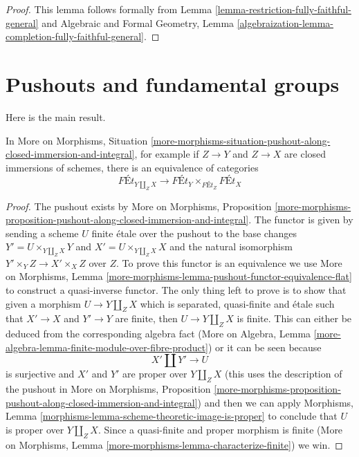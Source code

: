 \begin{proof}
This lemma follows formally from
Lemma \ref{lemma-restriction-fully-faithful-general} and
Algebraic and Formal Geometry, Lemma
\ref{algebraization-lemma-completion-fully-faithful-general}.
\end{proof}






\section{Pushouts and fundamental groups}
\label{section-pushouts}

\noindent
Here is the main result.

\begin{lemma}
\label{lemma-pushout-along-closed-immersion-and-integral}
In More on Morphisms, Situation
\ref{more-morphisms-situation-pushout-along-closed-immersion-and-integral},
for example if $Z \to Y$ and $Z \to X$ are closed immersions of schemes,
there is an equivalence of categories
$$
\textit{F\'Et}_{Y \amalg_Z X}
\longrightarrow
\textit{F\'Et}_Y
\times_{\textit{F\'Et}_Z}
\textit{F\'Et}_X
$$
\end{lemma}

\begin{proof}
The pushout exists by
More on Morphisms, Proposition
\ref{more-morphisms-proposition-pushout-along-closed-immersion-and-integral}.
The functor is given by sending a scheme $U$ finite \'etale over the
pushout to the base changes $Y' = U \times_{Y \amalg_Z X} Y$
and $X' = U \times_{Y \amalg_Z X} X$ and the natural isomorphism
$Y' \times_Y Z \to X' \times_X Z$ over $Z$. To prove this functor
is an equivalence we use
More on Morphisms, Lemma
\ref{more-morphisms-lemma-pushout-functor-equivalence-flat}
to construct a quasi-inverse functor.
The only thing left to prove is to show that given a morphism
$U \to Y \amalg_Z X$ which is separated, quasi-finite and \'etale
such that $X' \to X$ and $Y' \to Y$ are finite,
then $U \to Y \amalg_Z X$ is finite.
This can either be deduced from the corresponding algebra fact
(More on Algebra, Lemma
\ref{more-algebra-lemma-finite-module-over-fibre-product})
or it can be seen because
$$
X' \amalg Y' \to U
$$
is surjective and $X'$ and $Y'$ are proper over $Y \amalg_Z X$
(this uses the description of the pushout in More on Morphisms, Proposition
\ref{more-morphisms-proposition-pushout-along-closed-immersion-and-integral})
and then we can apply
Morphisms, Lemma \ref{morphisms-lemma-scheme-theoretic-image-is-proper}
to conclude that $U$ is proper over $Y \amalg_Z X$.
Since a quasi-finite and proper morphism is finite
(More on Morphisms, Lemma \ref{more-morphisms-lemma-characterize-finite})
we win.
\end{proof}





